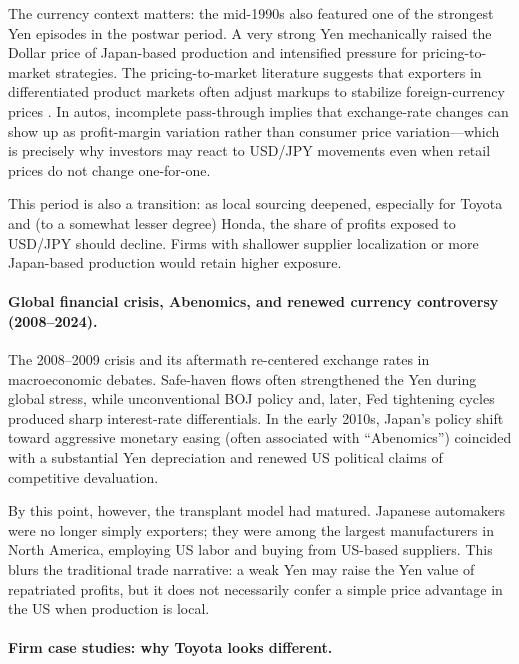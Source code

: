 \documentclass[12pt,a4paper]{article}
\begin{document}
The currency context matters: the mid-1990s also featured one of the strongest Yen episodes in the postwar period. A very strong Yen mechanically raised the Dollar price of Japan-based production and intensified pressure for pricing-to-market strategies. The pricing-to-market literature suggests that exporters in differentiated product markets often adjust markups to stabilize foreign-currency prices \citep{krugman1987,knetter1993}. In autos, incomplete pass-through implies that exchange-rate changes can show up as profit-margin variation rather than consumer price variation---which is precisely why investors may react to USD/JPY movements even when retail prices do not change one-for-one.

This period is also a transition: as local sourcing deepened, especially for Toyota and (to a somewhat lesser degree) Honda, the share of profits exposed to USD/JPY should decline. Firms with shallower supplier localization or more Japan-based production would retain higher exposure.

\paragraph{Global financial crisis, Abenomics, and renewed currency controversy (2008--2024).}

The 2008--2009 crisis and its aftermath re-centered exchange rates in macroeconomic debates. Safe-haven flows often strengthened the Yen during global stress, while unconventional BOJ policy and, later, Fed tightening cycles produced sharp interest-rate differentials. In the early 2010s, Japan's policy shift toward aggressive monetary easing (often associated with ``Abenomics'') coincided with a substantial Yen depreciation and renewed US political claims of competitive devaluation.

By this point, however, the transplant model had matured. Japanese automakers were no longer simply exporters; they were among the largest manufacturers in North America, employing US labor and buying from US-based suppliers. This blurs the traditional trade narrative: a weak Yen may raise the Yen value of repatriated profits, but it does not necessarily confer a simple price advantage in the US when production is local.

\paragraph{Firm case studies: why Toyota looks different.}
\end{document}
